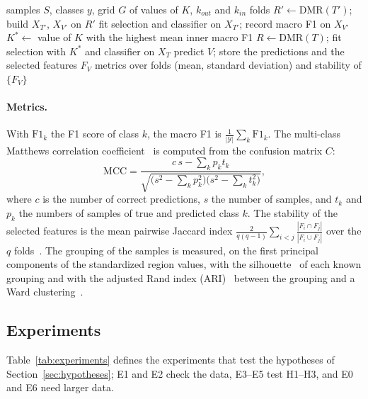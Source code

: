 \documentclass[runningheads]{llncs}
\begin{document}
\begin{algorithm}[!htb]
\caption{Leakage-free nested cross-validation.}
\label{alg:ncv}
\begin{algorithmic}[1]
\Require samples $S$, classes $y$, grid $G$ of values of $K$, $k_{out}$ and $k_{in}$ folds
    \State $R'\gets\mathrm{DMR}(T')$; build $X_{T'}$, $X_{V'}$ on $R'$
      \State fit selection and classifier on $X_{T'}$; record macro F1 on $X_{V'}$
    \EndFor
  \EndFor
  \State $K^{*}\gets$ value of $K$ with the highest mean inner macro F1
  \State $R\gets\mathrm{DMR}(T)$; fit selection with $K^{*}$ and classifier on $X_T$
  \State predict $V$; store the predictions and the selected features $F_V$
\EndFor
\State \Return metrics over folds (mean, standard deviation) and stability of $\{F_V\}$
\end{algorithmic}
\end{algorithm}

\paragraph{Metrics.} With $\mathrm{F1}_k$ the F1 score of class $k$, the macro F1 is $\frac{1}{|\mathcal{Y}|}\sum_k\mathrm{F1}_k$. The multi-class Matthews correlation coefficient~\cite{chicco2020} is computed from the confusion matrix $C$:
\[
\mathrm{MCC}=\frac{c\,s-\sum_k p_k t_k}{\sqrt{\bigl(s^2-\sum_k p_k^2\bigr)\bigl(s^2-\sum_k t_k^2\bigr)}},
\]
where $c$ is the number of correct predictions, $s$ the number of samples, and $t_k$ and $p_k$ the numbers of samples of true and predicted class $k$. The stability of the selected features is the mean pairwise Jaccard index $\frac{2}{q(q-1)}\sum_{i<j}\frac{|F_i\cap F_j|}{|F_i\cup F_j|}$ over the $q$ folds~\cite{nogueira2018}. The grouping of the samples is measured, on the first principal components of the standardized region values, with the silhouette~\cite{rousseeuw1987} of each known grouping and with the adjusted Rand index (ARI)~\cite{hubert1985} between the grouping and a Ward clustering~\cite{ward1963}.

\subsection{Experiments}
Table~\ref{tab:experiments} defines the experiments that test the hypotheses of Section~\ref{sec:hypotheses}; E1 and E2 check the data, E3--E5 test H1--H3, and E0 and E6 need larger data.
\end{document}
